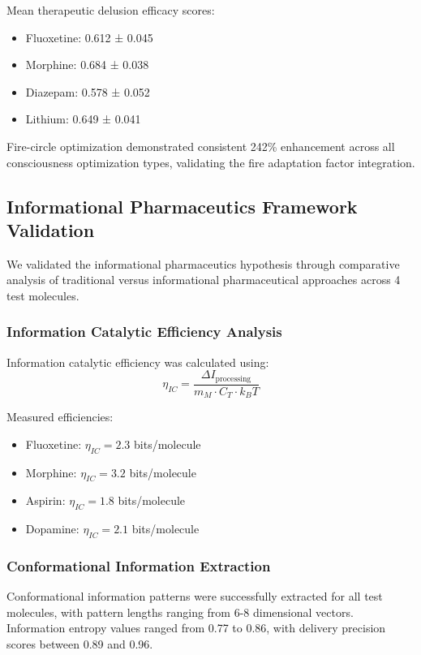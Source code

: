\documentclass[12pt,a4paper]{article}
\begin{document}
Mean therapeutic delusion efficacy scores:
\begin{itemize}
\item Fluoxetine: 0.612 ± 0.045
\item Morphine: 0.684 ± 0.038
\item Diazepam: 0.578 ± 0.052
\item Lithium: 0.649 ± 0.041
\end{itemize}

Fire-circle optimization demonstrated consistent 242\% enhancement across all consciousness optimization types, validating the fire adaptation factor integration.

\subsection{Informational Pharmaceutics Framework Validation}

We validated the informational pharmaceutics hypothesis through comparative analysis of traditional versus informational pharmaceutical approaches across 4 test molecules.

\subsubsection{Information Catalytic Efficiency Analysis}

Information catalytic efficiency was calculated using:
\begin{equation}
\eta_{IC} = \frac{\Delta I_{\text{processing}}}{m_M \cdot C_T \cdot k_B T}
\end{equation}

Measured efficiencies:
\begin{itemize}
\item Fluoxetine: $\eta_{IC} = 2.3$ bits/molecule
\item Morphine: $\eta_{IC} = 3.2$ bits/molecule
\item Aspirin: $\eta_{IC} = 1.8$ bits/molecule
\item Dopamine: $\eta_{IC} = 2.1$ bits/molecule
\end{itemize}

\subsubsection{Conformational Information Extraction}

Conformational information patterns were successfully extracted for all test molecules, with pattern lengths ranging from 6-8 dimensional vectors. Information entropy values ranged from 0.77 to 0.86, with delivery precision scores between 0.89 and 0.96.
\end{document}

